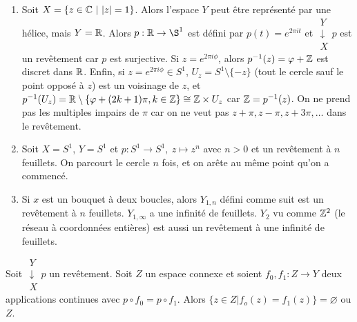   
  \begin{exs}
    \begin{enumerate}
    \item Soit $X = \{z \in \mathbb{C}\ |\ |z| = 1 \}$. Alors l'espace $Y$ peut être représenté par une hélice, mais $Y
      = \mathbb{R}$. Alors $p: \R \to \S^1$ est défini par $p(t) = e^{2\pi i t}$ et $\substack{Y\\\downarrow\\ X}p$
      est un revêtement car $p$ est surjective. Si $z = e^{2\pi i \phi}$, alors $p^{-1}(z) = \varphi + \mathbb{Z}$ est
      discret dans $\mathbb{R}$. Enfin, si $z = e^{2 \pi i \phi} \in S^1$, $U_z = S^1 \setminus \{-z\}$ (tout le
      cercle sauf le point opposé à $z$) est un voisinage de $z$, et $p^{-1}(U_z) = \mathbb{R} \setminus \{\varphi +
      (2k+1)\pi, k \in \mathbb{Z}\} \cong \mathbb{Z} \times U_z$ car $\mathbb{Z} = p^{-1}(z)$. On ne prend pas les multiples impairs
      de $\pi$ car on ne veut pas $z+\pi, z-\pi, z+3\pi, \ldots$ dans le revêtement.

    \item Soit $X = S^1$, $Y = S^1$ et $p: S^1 \to S^1,\ z \mapsto z^n$ avec $n > 0$ et un revêtement à $n$
      feuillets. On parcourt le cercle $n$ fois, et on arête au même point qu'on a commencé.

    \item Si $x$ est un bouquet à deux boucles, alors $Y_{1,n}$ défini comme suit est un revêtement à $n$
      feuillets. $Y_{1, \infty}$ a une infinité de feuillets. $Y_2$ vu comme $\mathbb{Z}^2$ (le réseau à coordonnées
      entières) est aussi un revêtement à une infinité de feuillets.
    \end{enumerate}
  \end{exs}



  \begin{lem} \label{lem:lemme-A}
    Soit $\substack{Y\\\downarrow\\ X}p$ un revêtement. Soit $Z$ un espace connexe et soient $f_0, f_1 : Z
    \to Y$ deux applications continues avec $p \circ f_0 = p \circ f_1$. Alors $\{z \in Z | f_o(z) = f_1(z)\}
    = \varnothing$ ou $Z$.
    \begin{center}
    \end{center}
  \end{lem}

